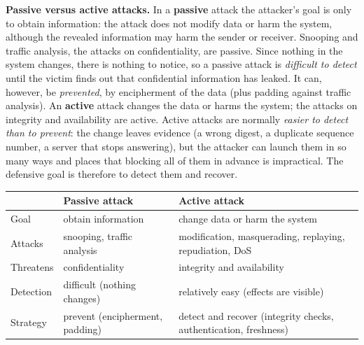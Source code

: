 \textbf{Passive versus active attacks.} In a \textbf{passive} attack the attacker's goal is only to obtain information: the attack does not modify data or harm the system, although the revealed information may harm the sender or receiver. Snooping and traffic analysis, the attacks on confidentiality, are passive. Since nothing in the system changes, there is nothing to notice, so a passive attack is \emph{difficult to detect} until the victim finds out that confidential information has leaked. It can, however, be \emph{prevented}, by encipherment of the data (plus padding against traffic analysis). An \textbf{active} attack changes the data or harms the system; the attacks on integrity and availability are active. Active attacks are normally \emph{easier to detect than to prevent}: the change leaves evidence (a wrong digest, a duplicate sequence number, a server that stops answering), but the attacker can launch them in so many ways and places that blocking all of them in advance is impractical. The defensive goal is therefore to detect them and recover.
\begin{center}\small
\begin{tabularx}{\textwidth}{@{}l X X@{}}
\toprule
 & Passive attack & Active attack\\
\midrule
Goal & obtain information & change data or harm the system\\
Attacks & snooping, traffic analysis & modification, masquerading, replaying, repudiation, DoS\\
Threatens & confidentiality & integrity and availability\\
Detection & difficult (nothing changes) & relatively easy (effects are visible)\\
Strategy & prevent (encipherment, padding) & detect and recover (integrity checks, authentication, freshness)\\
\bottomrule
\end{tabularx}
\end{center}


